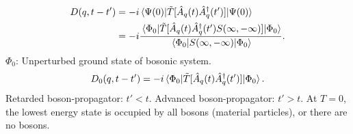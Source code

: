 \begin{align*} 
D(q, t-t') &= -i\ev{\tilde{T}[\hat{A}_q(t)\hat{A}_q^\dagger(t')]}{\Psi(0)} \\
&= -i\frac{\ev{\tilde{T}[\hat{A}_q(t)\hat{A}_q^\dagger(t')S(\infty, -\infty)]}{\Phi_0}}{\ev{S(\infty, -\infty)}{\Phi_0}}.
\end{align*}
$\Phi_0$: Unperturbed ground state of bosonic system. 
\begin{equation} 
D_0(q, t-t') = -i\ev{\tilde{T}[\hat{A}_q(t)\hat{A}_q^\dagger(t')]}{\Phi_0}.
\end{equation}
Retarded boson-propagator: $t'<t$. Advanced boson-propagator: $t'>t$. At $T = 0$, the lowest energy state is occupied by all bosons (material particles), or there are no bosons.